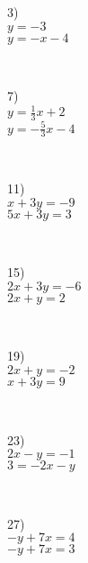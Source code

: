 \begin{multicols}{4}
  3)\\
  $y = - 3$\\
	$y = - x - 4$\par
  ~\par
  7)\\
  $y = \frac{1}{3} x + 2$\\
	$y = - \frac{5}{3} x - 4$\par
  ~\par
  11)\\
  $x + 3 y = - 9$\\
	$5 x + 3 y = 3$\par
  ~\par
  15)\\
  $2 x + 3 y = - 6$\\
	$2 x + y = 2$\par
  ~\par
  19)\\
  $2 x + y = - 2$\\
	$x + 3 y = 9$\par
  ~\par
  23)\\
  $2 x - y = - 1$\\
	$3 = - 2 x - y$\par
  ~\par
  27)\\
  $- y + 7 x = 4$\\
	$- y + 7 x = 3$\par
  ~\par
	~\par
	~\par
	~\par
	~\par
	~\par
  ~\par


\end{multicols}
